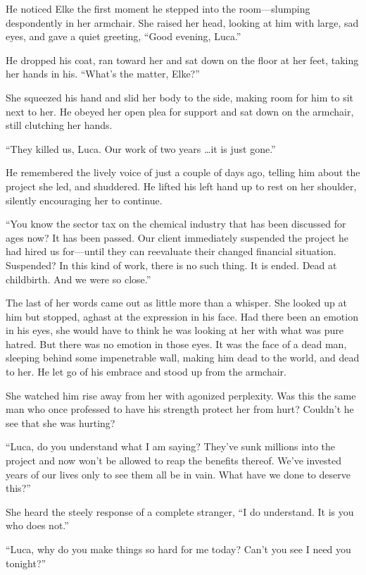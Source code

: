 He noticed Elke the first moment he stepped into the room---slumping despondently in her armchair. She raised her head, looking at him with large, sad eyes, and gave a quiet greeting, ``Good evening, Luca.''

He dropped his coat, ran toward her and sat down on the floor at her feet, taking her hands in his. ``What's the matter, Elke?''

She squeezed his hand and slid her body to the side, making room for him to sit next to her. He obeyed her open plea for support and sat down on the armchair, still clutching her hands.

``They killed us, Luca. Our work of two years \ldots it is just gone.''

He remembered the lively voice of just a couple of days ago, telling him about the project she led, and shuddered. He lifted his left hand up to rest on her shoulder, silently encouraging her to continue.

``You know the sector tax on the chemical industry that has been discussed for ages now? It has been passed. Our client immediately suspended the project he had hired us for---until they can reevaluate their changed financial situation. Suspended? In this kind of work, there is no such thing. It is ended. Dead at childbirth. And we were so close.''

The last of her words came out as little more than a whisper. She looked up at him but stopped, aghast at the expression in his face. Had there been an emotion in his eyes, she would have to think he was looking at her with what was pure hatred. But there was no emotion in those eyes. It was the face of a dead man, sleeping behind some impenetrable wall, making him dead to the world, and dead to her. He let go of his embrace and stood up from the armchair.

She watched him rise away from her with agonized perplexity. Was this the same man who once professed to have his strength protect her from hurt? Couldn't he see that she was hurting?

``Luca, do you understand what I am saying? They've sunk millions into the project and now won't be allowed to reap the benefits thereof. We've invested years of our lives only to see them all be in vain. What have we done to deserve this?''

She heard the steely response of a complete stranger, ``I do understand. It is you who does not.''

``Luca, why do you make things so hard for me today? Can't you see I need you tonight?''

